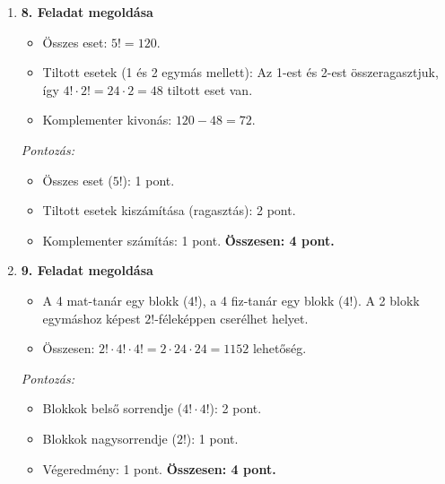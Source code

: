 \documentclass[12pt,a4paper]{article}
\begin{document}
\begin{enumerate}
    \vspace{0.3cm}

    \item \textbf{8. Feladat megoldása}
    \begin{itemize}
        \item Összes eset: $5! = 120$.
        \item Tiltott esetek (1 és 2 egymás mellett): Az 1-est és 2-est összeragasztjuk, így $4! \cdot 2! = 24 \cdot 2 = 48$ tiltott eset van.
        \item Komplementer kivonás: $120 - 48 = 72$.
    \end{itemize}
    \emph{Pontozás:}
    \begin{itemize}
        \item Összes eset ($5!$): 1 pont.
        \item Tiltott esetek kiszámítása (ragasztás): 2 pont.
        \item Komplementer számítás: 1 pont.
        \textbf{Összesen: 4 pont.}
    \end{itemize}

    \vspace{0.3cm}

    \item \textbf{9. Feladat megoldása}
    \begin{itemize}
        \item A 4 mat-tanár egy blokk ($4!$), a 4 fiz-tanár egy blokk ($4!$). A 2 blokk egymáshoz képest $2!$-féleképpen cserélhet helyet.
        \item Összesen: $2! \cdot 4! \cdot 4! = 2 \cdot 24 \cdot 24 = 1152$ lehetőség.
    \end{itemize}
    \emph{Pontozás:}
    \begin{itemize}
        \item Blokkok belső sorrendje ($4! \cdot 4!$): 2 pont.
        \item Blokkok nagysorrendje ($2!$): 1 pont.
        \item Végeredmény: 1 pont.
        \textbf{Összesen: 4 pont.}
    \end{itemize}

    \vspace{0.3cm}


\end{enumerate}
\end{document}

